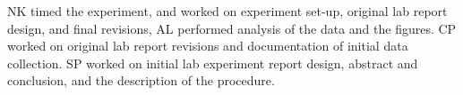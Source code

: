 ﻿\documentclass[reprint,amsmath,amssymb,aps,twoside]{revtex4-2}
\begin{document}
NK timed the experiment, and worked on experiment set-up, original lab report design, and final revisions, AL performed analysis of the data and the figures. CP worked on original lab report revisions and documentation of initial data collection. SP worked on initial lab experiment report design, abstract and conclusion, and the description of the procedure. 




%

\end{document}
